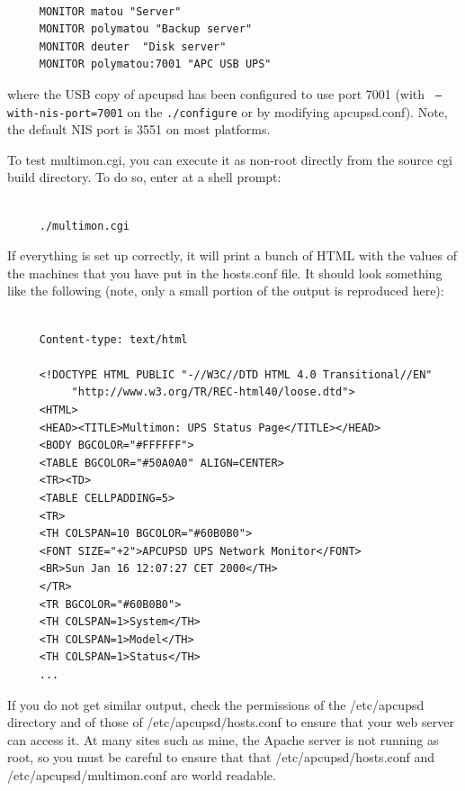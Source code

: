 \footnotesize
\begin{verbatim}
     
     MONITOR matou "Server"
     MONITOR polymatou "Backup server"
     MONITOR deuter  "Disk server"
     MONITOR polymatou:7001 "APC USB UPS"
\end{verbatim}
\normalsize

where the USB copy of apcupsd has been configured to use port 7001 (with {\tt
--with-nis-port=7001} on the {\tt ./configure} or by modifying apcupsd.conf).
Note, the default NIS port is 3551 on most platforms.  

To test multimon.cgi, you can execute it as non-root directly from the source
cgi build directory. To do so, enter at a shell prompt: 

\footnotesize
\begin{verbatim}
     
     ./multimon.cgi
\end{verbatim}
\normalsize

If everything is set up correctly, it will print a bunch of HTML with the
values of the machines that you have put in the hosts.conf file. It should
look something like the following (note, only a small portion of the output is
reproduced here): 

\footnotesize
\begin{verbatim}
     
     Content-type: text/html
     
     <!DOCTYPE HTML PUBLIC "-//W3C//DTD HTML 4.0 Transitional//EN"
          "http://www.w3.org/TR/REC-html40/loose.dtd">
     <HTML>
     <HEAD><TITLE>Multimon: UPS Status Page</TITLE></HEAD>
     <BODY BGCOLOR="#FFFFFF">
     <TABLE BGCOLOR="#50A0A0" ALIGN=CENTER>
     <TR><TD>
     <TABLE CELLPADDING=5>
     <TR>
     <TH COLSPAN=10 BGCOLOR="#60B0B0">
     <FONT SIZE="+2">APCUPSD UPS Network Monitor</FONT>
     <BR>Sun Jan 16 12:07:27 CET 2000</TH>
     </TR>
     <TR BGCOLOR="#60B0B0">
     <TH COLSPAN=1>System</TH>
     <TH COLSPAN=1>Model</TH>
     <TH COLSPAN=1>Status</TH>
     ...
\end{verbatim}
\normalsize

If you do not get similar output, check the permissions of the /etc/apcupsd
directory and of those of /etc/apcupsd/hosts.conf to ensure that your web
server can access it. At many sites such as mine, the Apache server is not
running as root, so you must be careful to ensure that that
/etc/apcupsd/hosts.conf and /etc/apcupsd/multimon.conf are world readable.  

